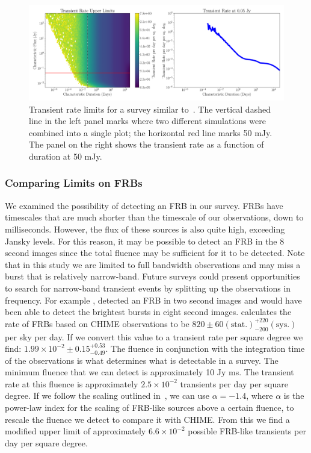 \documentclass[12pt]{article}
\begin{document}
\begin{figure}
	\includegraphics[width=\textwidth]{bowerandsauletal.png}
	\caption{Transient rate limits for a survey similar to~\citet{2011ApJ...728L..14B}. The vertical dashed line in the left panel marks where two different simulations were combined into a single plot; the horizontal red line marks 50 mJy. The panel on the right shows the transient rate as a function of duration at 50 mJy.}
	\label{fig:bowerandsaulall}
\end{figure}

\subsubsection{Comparing Limits on FRBs}
We examined the possibility of detecting an FRB in our survey. FRBs have timescales that are much shorter than the timescale of our observations, down to milliseconds. However, the flux of these sources is also quite high, exceeding Jansky levels. For this reason, it may be possible to detect an FRB in the 8 second images since the total fluence may be sufficient for it to be detected. Note that in this study we are limited to full bandwidth observations and may miss a burst that is relatively narrow-band. Future surveys could present opportunities to search for narrow-band transient events by splitting up the observations in frequency.
 For example \citet{2023MNRAS.518.3462A}, detected an FRB in two second images and would have been able to detect the brightest bursts in eight second images.  \citet{2021ApJS..257...59C} calculates the rate of FRBs based on CHIME observations to be $820\pm 60 (\text{stat.})_{-200}^{+220}(\text{sys.})$ per sky per day. If we convert this value to a transient rate per square degree we find: $1.99\times10^{-2}\pm0.15_{-0.49}^{+0.53}$. The fluence in conjunction with the integration time of the observations is what determines what is detectable in a survey. The minimum fluence that we can detect is approximately 10 Jy ms. The transient rate at this fluence is approximately $2.5\times10^{-2}$ transients per day per square degree.  If we follow the scaling outlined in~\citet{2021ApJS..257...59C}, we can use $\alpha=-1.4$, where $\alpha$ is the power-law index for the scaling of FRB-like sources above a certain fluence, to rescale the fluence we detect to compare it with CHIME. From this we find a modified upper limit of approximately $6.6\times10^{-2}$  possible FRB-like transients per day per square degree. 
 
\end{document}
